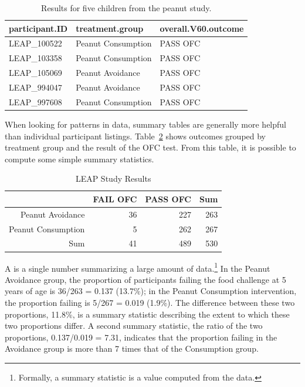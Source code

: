 \begin{table}[ht]
\centering
\begin{tabular}{lll}
  \hline
participant.ID & treatment.group & overall.V60.outcome \\ 
  \hline
LEAP\_100522 & Peanut Consumption & PASS OFC \\ 
  LEAP\_103358 & Peanut Consumption & PASS OFC \\ 
  LEAP\_105069 & Peanut Avoidance & PASS OFC \\ 
  LEAP\_994047 & Peanut Avoidance & PASS OFC \\ 
  LEAP\_997608 & Peanut Consumption & PASS OFC \\ 
   \hline
\end{tabular}
\caption{Results for five children from the peanut study.}
\label{leapStudyResultsDF}
\end{table}


When looking for patterns in data, summary tables are generally more helpful than individual participant listings. Table~\ref{leapStudyResults} shows outcomes grouped by treatment group and the result of the OFC test. From this table, it is possible to compute some simple summary statistics. 

\begin{table}[ht]
\centering
\begin{tabular}{rrrr}
  \hline
 & FAIL OFC & PASS OFC & Sum \\ 
  \hline
Peanut Avoidance & 36 & 227 & 263 \\ 
  Peanut Consumption & 5 & 262 & 267 \\ 
  Sum & 41 & 489 & 530 \\ 
   \hline
\end{tabular}
\caption{LEAP Study Results} 
\label{leapStudyResults}
\end{table}


A  is a single number summarizing a large amount of data.\footnote{Formally, a summary statistic is a value computed from the data.} In the Peanut Avoidance group, the proportion of participants failing the food challenge at 5 years of age is 36/263 = 0.137 (13.7\%); in the Peanut Consumption intervention, the proportion failing is 5/267 = 0.019 (1.9\%). The difference between these two proportions, 11.8\%, is a summary statistic describing the extent to which these two proportions differ. A second summary statistic, the ratio of the two proportions, 0.137/0.019 = 7.31, indicates that the proportion failing in the Avoidance group is more than 7 times that of the Consumption group.   


